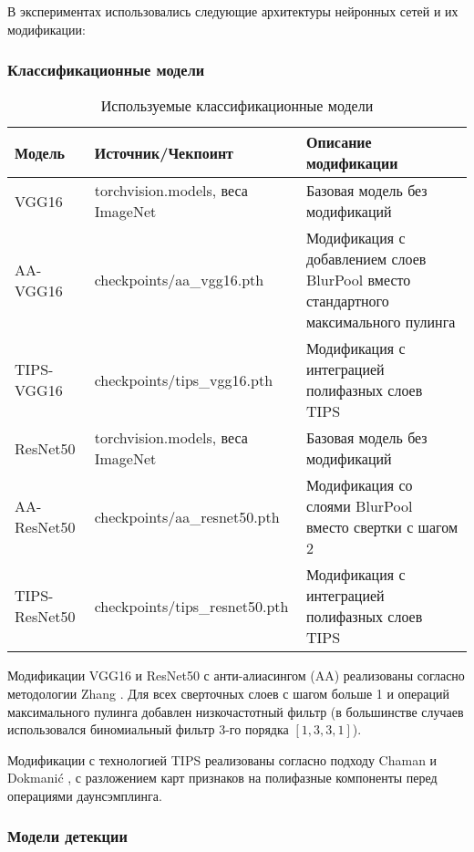 В экспериментах использовались следующие архитектуры нейронных сетей и их модификации:

\subsubsection{Классификационные модели}
\label{experiments:setup:checkpoints:classification}

\begin{table}[ht]
\centering
\caption{Используемые классификационные модели}
\label{tab:classification_models}
\begin{tabular}{|p{3cm}|p{4cm}|p{6cm}|}
\hline
\textbf{Модель} & \textbf{Источник/Чекпоинт} & \textbf{Описание модификации} \\ \hline
VGG16 & torchvision.models, веса ImageNet & Базовая модель без модификаций \\ \hline
AA-VGG16 & checkpoints/aa\_vgg16.pth & Модификация с добавлением слоев BlurPool вместо стандартного максимального пулинга \\ \hline
TIPS-VGG16 & checkpoints/tips\_vgg16.pth & Модификация с интеграцией полифазных слоев TIPS \\ \hline
ResNet50 & torchvision.models, веса ImageNet & Базовая модель без модификаций \\ \hline
AA-ResNet50 & checkpoints/aa\_resnet50.pth & Модификация со слоями BlurPool вместо свертки с шагом 2 \\ \hline
TIPS-ResNet50 & checkpoints/tips\_resnet50.pth & Модификация с интеграцией полифазных слоев TIPS \\ \hline
\end{tabular}
\end{table}

Модификации VGG16 и ResNet50 с анти-алиасингом (AA) реализованы согласно методологии Zhang \cite{Zhang2019}. Для всех сверточных слоев с шагом больше 1 и операций максимального пулинга добавлен низкочастотный фильтр (в большинстве случаев использовался биномиальный фильтр 3-го порядка $[1, 3, 3, 1]$).

Модификации с технологией TIPS реализованы согласно подходу Chaman и Dokmanić \cite{Chaman2021}, с разложением карт признаков на полифазные компоненты перед операциями даунсэмплинга.

\subsubsection{Модели детекции}
\label{experiments:setup:checkpoints:detection}

